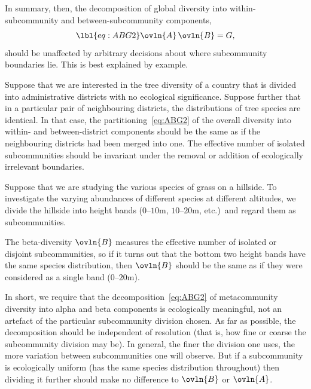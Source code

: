 In summary, then, the decomposition of global diversity into
within-subcommunity and between-subcommunity components,
% 
\begin{equation}
\lbl{eq:ABG2}
\ovln{A} \, \ovln{B} = G,
\end{equation}
% 
should be unaffected by arbitrary decisions about where subcommunity
boundaries lie.  This is best explained by example.

\begin{example}
Suppose that we are interested in the tree%
%
% 
diversity of a country that is divided into administrative districts with
no ecological significance.  Suppose further that in a particular pair of
neighbouring districts, the distributions of tree species are identical.
In that case, the partitioning~\eqref{eq:ABG2} of the overall diversity
into within- and between-district components should be the same as if the
neighbouring districts had been merged into one.  The effective number of
isolated subcommunities should be invariant under the removal or addition
of ecologically irrelevant boundaries.
\end{example}

\begin{example}
Suppose that we are studying the various species of grass on a
hillside.%
%
%
To investigate the varying abundances of different species at different
altitudes, we divide the hillside into height bands ($0$--$10$m,
$10$--$20$m, etc.)\ and regard them as subcommunities.

The beta-diversity $\ovln{B}$ measures the effective number of
isolated or disjoint subcommunities, so if it turns out that the bottom two
height bands have the same species distribution, then $\ovln{B}$ should be
the same as if they were considered as a single band ($0$--$20$m).
\end{example}

In short, we require that the decomposition~\eqref{eq:ABG2} of
metacommunity diversity into alpha and beta components is ecologically
meaningful, not an artefact of the particular subcommunity division chosen.
As far as possible, the decomposition should be independent of
resolution (that is, how fine or coarse the subcommunity
division may be).  In general, the finer the division one uses, the more
variation between subcommunities one will observe.  But if a subcommunity
is ecologically uniform (has the same species distribution throughout) then
dividing it further should make no difference to $\ovln{B}$ or $\ovln{A}$.

